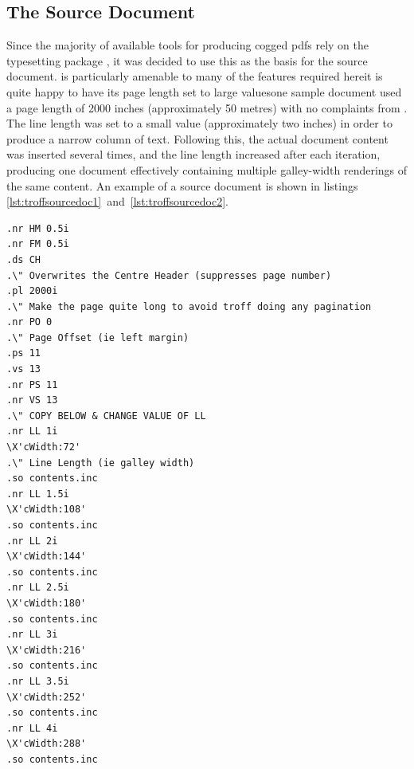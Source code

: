 \subsection{The Source Document}\label{sec:srcdoc}
Since the majority of available tools for producing \gls{cog}ged \glspl{pdf} rely on the typesetting package \ditroff{}, it was decided to use this as the basis for the source document. \Ditroff{} is particularly amenable to many of the features required here\ed{}it is quite happy to have its page length set to large values\ed{}one sample document used a page length of 2000 inches (approximately 50 metres) with no complaints from \ditroff{}. The line length was set to a small value (approximately two inches) in order to produce a narrow column of text. Following this, the actual document content was inserted several times, and the line length increased after each iteration, producing one document effectively containing multiple galley-width renderings of the same content. An example of a source document is shown in listings \ref{lst:troffsourcedoc1}~and~\ref{lst:troffsourcedoc2}.

\begin{lstlisting}[label=lst:troffsourcedoc1,captionpos=b,float,caption={[A sample troff source document, part 1]A sample troff source document. The actual document text is in a file named {\tt contents.inc} , and is imported multiple times with the {\tt .so} macro. After each import, the current line length is changed (using, for example, {\tt .nr LL 1.5i} to set Line Length register to 1.5 inches). The {\tt \textbackslash X} commands are used to pass arbitrary data through the typesetter, and into the resultant ditroff intermediate code for later use. In this case, it is used to pass the column width (hence ``cWidth'') in points, so that this data can later be embedded within the final \pdf{} file.}]
.nr HM 0.5i
.nr FM 0.5i
.ds CH 
.\" Overwrites the Centre Header (suppresses page number)
.pl 2000i
.\" Make the page quite long to avoid troff doing any pagination
.nr PO 0
.\" Page Offset (ie left margin)
.ps 11
.vs 13
.nr PS 11
.nr VS 13
.\" COPY BELOW & CHANGE VALUE OF LL
.nr LL 1i
\X'cWidth:72'
.\" Line Length (ie galley width)
.so contents.inc
.nr LL 1.5i
\X'cWidth:108'
.so contents.inc
.nr LL 2i
\X'cWidth:144'
.so contents.inc
.nr LL 2.5i
\X'cWidth:180'
.so contents.inc
.nr LL 3i
\X'cWidth:216'
.so contents.inc
.nr LL 3.5i
\X'cWidth:252'
.so contents.inc
.nr LL 4i
\X'cWidth:288'
.so contents.inc
\end{lstlisting}


